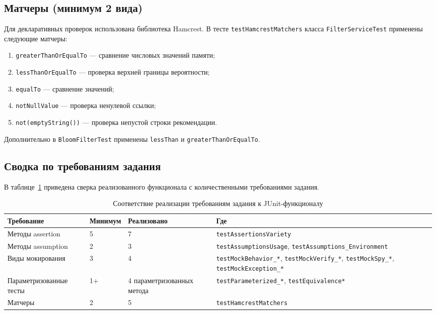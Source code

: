 \subsection{Матчеры (минимум 2 вида)}
Для декларативных проверок использована библиотека Hamcrest. В тесте \texttt{testHamcrestMatchers} класса \texttt{FilterServiceTest} применены следующие матчеры:
\begin{enumerate}
    \item \texttt{greaterThanOrEqualTo} --- сравнение числовых значений памяти;
    \item \texttt{lessThanOrEqualTo} --- проверка верхней границы вероятности;
    \item \texttt{equalTo} --- сравнение значений;
    \item \texttt{notNullValue} --- проверка ненулевой ссылки;
    \item \texttt{not(emptyString())} --- проверка непустой строки рекомендации.
\end{enumerate}
Дополнительно в \texttt{BloomFilterTest} применены \texttt{lessThan} и \texttt{greaterThanOrEqualTo}.

\subsection{Сводка по требованиям задания}
В таблице~\ref{tab:reqs-checklist} приведена сверка реализованного функционала с количественными требованиями задания.

\begin{table}[ht]
\centering\small
\caption{Соответствие реализации требованиям задания к JUnit-функционалу}
\label{tab:reqs-checklist}
\begin{tabular}{|p{4.5cm}|p{2.5cm}|p{2.5cm}|p{4.0cm}|}
\hline
\textbf{Требование} & \textbf{Минимум} & \textbf{Реализовано} & \textbf{Где} \\
\hline
Методы assertion & 5 & 7 & \texttt{testAssertionsVariety} \\
\hline
Методы assumption & 2 & 3 & \texttt{testAssumptionsUsage}, \texttt{testAssumptions\_Environment} \\
\hline
Виды мокирования & 3 & 4 & \texttt{testMockBehavior\_*}, \texttt{testMockVerify\_*}, \texttt{testMockSpy\_*}, \texttt{testMockException\_*} \\
\hline
Параметризованные тесты & 1+ & 4 параметризованных метода & \texttt{testParameterized\_*}, \texttt{testEquivalence*} \\
\hline
Матчеры & 2 & 5 & \texttt{testHamcrestMatchers} \\
\hline
\end{tabular}
\end{table}

